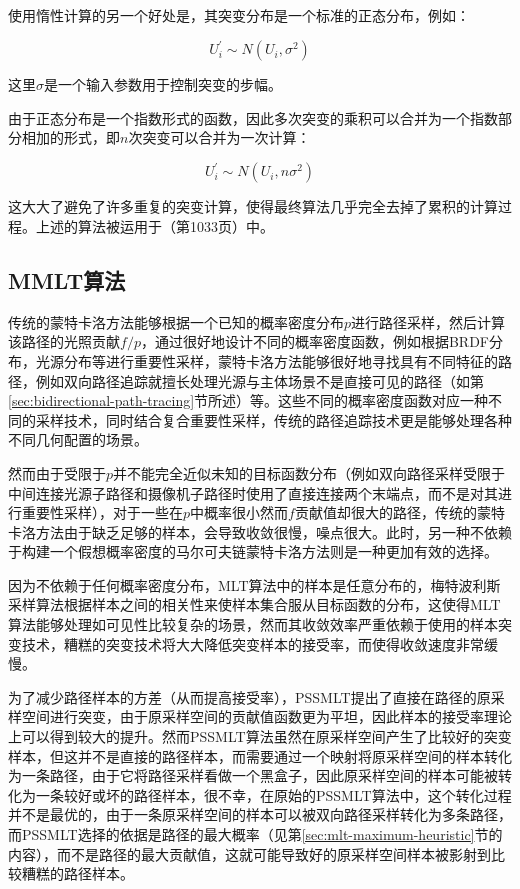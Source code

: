 使用惰性计算的另一个好处是，其突变分布是一个标准的正态分布，例如：

\begin{equation}
	U^{'}_i\sim N(U_i,\sigma^{2})
\end{equation}

\noindent 这里$\sigma$是一个输入参数用于控制突变的步幅。

由于正态分布是一个指数形式的函数，因此多次突变的乘积可以合并为一个指数部分相加的形式，即$n$次突变可以合并为一次计算：

\begin{equation}
	U^{'}_i\sim N(U_i,n\sigma^{2})
\end{equation}

这大大了避免了许多重复的突变计算，使得最终算法几乎完全去掉了累积的计算过程。上述的算法被运用于\cite{b:pbrt}（第1033页）中。




\subsection{MMLT算法}\label{sec:mlt-mmlt}
传统的蒙特卡洛方法能够根据一个已知的概率密度分布$p$进行路径采样，然后计算该路径的光照贡献$f/p$，通过很好地设计不同的概率密度函数，例如根据BRDF分布，光源分布等进行重要性采样，蒙特卡洛方法能够很好地寻找具有不同特征的路径，例如双向路径追踪就擅长处理光源与主体场景不是直接可见的路径（如第\ref{sec:bidirectional-path-tracing}节所述）等。这些不同的概率密度函数对应一种不同的采样技术，同时结合复合重要性采样，传统的路径追踪技术更是能够处理各种不同几何配置的场景。

然而由于受限于$p$并不能完全近似未知的目标函数分布（例如双向路径采样受限于中间连接光源子路径和摄像机子路径时使用了直接连接两个末端点，而不是对其进行重要性采样），对于一些在$p$中概率很小然而$f$贡献值却很大的路径，传统的蒙特卡洛方法由于缺乏足够的样本，会导致收敛很慢，噪点很大。此时，另一种不依赖于构建一个假想概率密度的马尔可夫链蒙特卡洛方法则是一种更加有效的选择。

因为不依赖于任何概率密度分布，MLT算法中的样本是任意分布的，梅特波利斯采样算法根据样本之间的相关性来使样本集合服从目标函数的分布，这使得MLT算法能够处理如可见性比较复杂的场景，然而其收敛效率严重依赖于使用的样本突变技术，糟糕的突变技术将大大降低突变样本的接受率，而使得收敛速度非常缓慢。

为了减少路径样本的方差（从而提高接受率），PSSMLT提出了直接在路径的原采样空间进行突变，由于原采样空间的贡献值函数更为平坦，因此样本的接受率理论上可以得到较大的提升。然而PSSMLT算法虽然在原采样空间产生了比较好的突变样本，但这并不是直接的路径样本，而需要通过一个映射将原采样空间的样本转化为一条路径，由于它将路径采样看做一个黑盒子，因此原采样空间的样本可能被转化为一条较好或坏的路径样本，很不幸，在原始的PSSMLT算法中，这个转化过程并不是最优的，由于一条原采样空间的样本可以被双向路径采样转化为多条路径，而PSSMLT选择的依据是路径的最大概率（见第\ref{sec:mlt-maximum-heuristic}节的内容），而不是路径的最大贡献值，这就可能导致好的原采样空间样本被影射到比较糟糕的路径样本。

